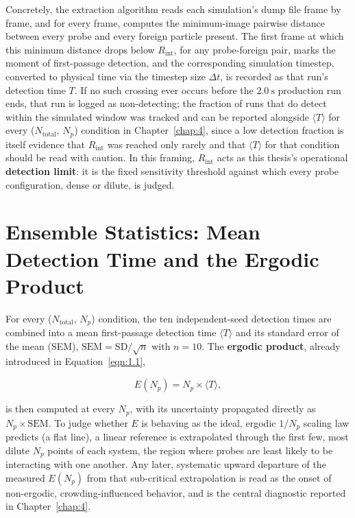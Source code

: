 Concretely, the extraction algorithm reads each simulation's dump file frame by frame, and for every frame, computes the minimum-image pairwise distance between every probe and every foreign particle present. The first frame at which this minimum distance drops below $R_\text{int}$, for any probe-foreign pair, marks the moment of first-passage detection, and the corresponding simulation timestep, converted to physical time via the timestep size $\Delta t$, is recorded as that run's detection time $T$. If no such crossing ever occurs before the $2.0~\text{s}$ production run ends, that run is logged as non-detecting; the fraction of runs that do detect within the simulated window was tracked and can be reported alongside $\langle T \rangle$ for every ($N_\text{total}$, $N_p$) condition in Chapter~\ref{chap:4}, since a low detection fraction is itself evidence that $R_\text{int}$ was reached only rarely and that $\langle T \rangle$ for that condition should be read with caution. In this framing, $R_\text{int}$ acts as this thesis's operational \textbf{detection limit}: it is the fixed sensitivity threshold against which every probe configuration, dense or dilute, is judged.

\section{Ensemble Statistics: Mean Detection Time and the Ergodic Product}
\label{sec:3.9}
For every ($N_\text{total}$, $N_p$) condition, the ten independent-seed detection times are combined into a mean first-passage detection time $\langle T \rangle$ and its standard error of the mean (SEM), $\text{SEM} = \text{SD}/\sqrt{n}$ with $n = 10$. The \textbf{ergodic product}, already introduced in Equation~\ref{eqn:1.1},

\begin{equation}
  E(N_p) = N_p \times \langle T \rangle,
  \label{eq:3.5}
\end{equation}

is then computed at every $N_p$, with its uncertainty propagated directly as $N_p \times \text{SEM}$. To judge whether $E$ is behaving as the ideal, ergodic $1/N_p$ scaling law predicts (a flat line), a linear reference is extrapolated through the first few, most dilute $N_p$ points of each system, the region where probes are least likely to be interacting with one another. Any later, systematic upward departure of the measured $E(N_p)$ from that sub-critical extrapolation is read as the onset of non-ergodic, crowding-influenced behavior, and is the central diagnostic reported in Chapter~\ref{chap:4}.

